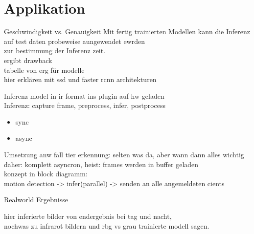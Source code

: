 \section[\thesection \  Applikation]{Applikation}\label{sec:application}

\begin{frame}{Geschwindigkeit vs. Genauigkeit}
    Mit fertig trainierten Modellen kann die Inferenz auf test daten probeweise aungewendet ewrden\\
    zur bestimmung der Inferenz zeit.\\
    ergibt drawback
    \\
    tabelle von erg für modelle
    \\
    hier erklären mit ssd und faster rcnn architekturen    
\end{frame}

\begin{frame}{Inferenz}
    model in ir format ins plugin auf hw geladen
    \\
    Inferenz: capture frame, preprocess, infer, postprocess
    \begin{itemize}
        \item sync
        \item async
    \end{itemize}
\end{frame}

\begin{frame}{Umsetzung}
    anw fall tier erkennung: selten was da, aber wann dann alles wichtig
    \\
    daher: komplett asyncron, heist: frames werden in buffer geladen
    \\
    konzept in block diagramm:
    \\
    motion detection -> infer(parallel) -> senden an alle angemeldeten cients

\end{frame}

\begin{frame}{Realworld Ergebnisse}

    hier inferierte bilder von endergebnis bei tag und nacht,\\
    nochwas zu infrarot bildern und rbg vs grau trainierte modell sagen.

\end{frame}
